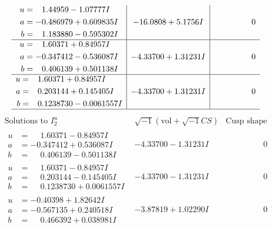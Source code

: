 \documentclass[1p]{elsarticle_modified}
\theoremstyle{definition}
\newcommand{\I}{\sqrt{-1}}
\begin{document}
$$\begin{array}{c|c|c}
\begin{aligned}
u &= \phantom{-}1.44959 - 1.07777 I \\
a &= -0.486979 + 0.609835 I \\
b &= \phantom{-}1.183880 - 0.595302 I\end{aligned}
 & -16.0808 + 5.1756 I & \phantom{-0.000000 } 0 \\ \hline\begin{aligned}
u &= \phantom{-}1.60371 + 0.84957 I \\
a &= -0.347412 - 0.536087 I \\
b &= \phantom{-}0.406139 + 0.501138 I\end{aligned}
 & -4.33700 + 1.31231 I & \phantom{-0.000000 } 0 \\ \hline\begin{aligned}
u &= \phantom{-}1.60371 + 0.84957 I \\
a &= \phantom{-}0.203144 + 0.145405 I \\
b &= \phantom{-}0.1238730 - 0.0061557 I\end{aligned}
 & -4.33700 + 1.31231 I & \phantom{-0.000000 } 0\\
 \hline 
 \end{array}$$\newpage$$\begin{array}{c|c|c}  
\text{Solutions to }I^u_{2}& \I (\text{vol} + \sqrt{-1}CS) & \text{Cusp shape}\\
 \hline 
\begin{aligned}
u &= \phantom{-}1.60371 - 0.84957 I \\
a &= -0.347412 + 0.536087 I \\
b &= \phantom{-}0.406139 - 0.501138 I\end{aligned}
 & -4.33700 - 1.31231 I & \phantom{-0.000000 } 0 \\ \hline\begin{aligned}
u &= \phantom{-}1.60371 - 0.84957 I \\
a &= \phantom{-}0.203144 - 0.145405 I \\
b &= \phantom{-}0.1238730 + 0.0061557 I\end{aligned}
 & -4.33700 - 1.31231 I & \phantom{-0.000000 } 0 \\ \hline\begin{aligned}
u &= -0.40398 + 1.82642 I \\
a &= -0.567135 + 0.240518 I \\
b &= \phantom{-}0.466392 + 0.038981 I\end{aligned}
 & -3.87819 + 1.02290 I & \phantom{-0.000000 } 0 \\ \hline\begin{aligned}

\end{aligned}
\end{array}$$
\end{document}
